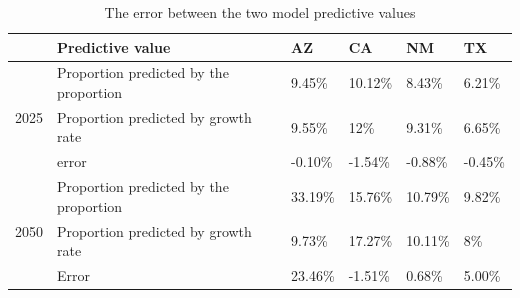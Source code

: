 \begin{table}[h]
	\centering
	\caption{The error between the two model predictive values}
	\label{error}
	\begin{tabular}{|l|l|l|l|l|l|}
		\hline
		& Predictive value                & AZ      & CA      & NM      & TX      \\ \hline
		\multirow{3}{*}{2025} & Proportion predicted by the proportion & 9.45\%  & 10.12\% & 8.43\%  & 6.21\%  \\ \cline{2-6} 
		& Proportion predicted by growth rate& 9.55\%  & 12\%    & 9.31\%  & 6.65\%  \\ \cline{2-6} 
		& error                           & -0.10\% & -1.54\% & -0.88\% & -0.45\% \\ \hline
		\multirow{3}{*}{2050} & Proportion predicted by the proportion  & 33.19\% & 15.76\% & 10.79\% & 9.82\%  \\ \cline{2-6} 
		& Proportion predicted by growth rate& 9.73\%  & 17.27\% & 10.11\% & 8\%     \\ \cline{2-6} 
		& Error                           & 23.46\% & -1.51\% & 0.68\%  & 5.00\%  \\ \hline
	\end{tabular}
\end{table}
